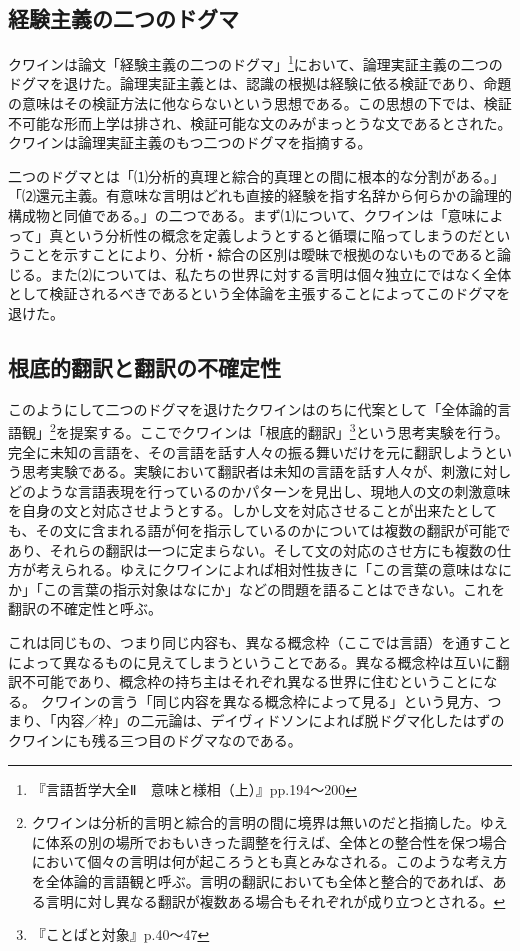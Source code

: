 \documentclass[b5j,twoside,twocolumn]{utarticle}
\begin{document}
\subsection{経験主義の二つのドグマ}
クワインは論文「経験主義の二つのドグマ」\footnote{『言語哲学大全Ⅱ　意味と様相（上）』pp.194〜200}において、論理実証主義の二つのドグマを退けた。論理実証主義とは、認識の根拠は経験に依る検証であり、命題の意味はその検証方法に他ならないという思想である。この思想の下では、検証不可能な形而上学は排され、検証可能な文のみがまっとうな文であるとされた。クワインは論理実証主義のもつ二つのドグマを指摘する。


二つのドグマとは「⑴分析的真理と綜合的真理との間に根本的な分割がある。」「⑵還元主義。有意味な言明はどれも直接的経験を指す名辞から何らかの論理的構成物と同値である。」の二つである。まず⑴について、クワインは「意味によって」真という分析性の概念を定義しようとすると循環に陥ってしまうのだということを示すことにより、分析・綜合の区別は曖昧で根拠のないものであると論じる。また⑵については、私たちの世界に対する言明は個々独立にではなく全体として検証されるべきであるという全体論を主張することによってこのドグマを退けた。
\subsection{根底的翻訳と翻訳の不確定性}
このようにして二つのドグマを退けたクワインはのちに代案として「全体論的言語観」\footnote{クワインは分析的言明と綜合的言明の間に境界は無いのだと指摘した。ゆえに体系の別の場所でおもいきった調整を行えば、全体との整合性を保つ場合において個々の言明は何が起ころうとも真とみなされる。このような考え方を全体論的言語観と呼ぶ。言明の翻訳においても全体と整合的であれば、ある言明に対し異なる翻訳が複数ある場合もそれぞれが成り立つとされる。}を提案する。ここでクワインは「根底的翻訳」\footnote{ 『ことばと対象』p.40〜47}という思考実験を行う。完全に未知の言語を、その言語を話す人々の振る舞いだけを元に翻訳しようという思考実験である。実験において翻訳者は未知の言語を話す人々が、刺激に対しどのような言語表現を行っているのかパターンを見出し、現地人の文の刺激意味を自身の文と対応させようとする。しかし文を対応させることが出来たとしても、その文に含まれる語が何を指示しているのかについては複数の翻訳が可能であり、それらの翻訳は一つに定まらない。そして文の対応のさせ方にも複数の仕方が考えられる。ゆえにクワインによれば相対性抜きに「この言葉の意味はなにか」「この言葉の指示対象はなにか」などの問題を語ることはできない。これを翻訳の不確定性と呼ぶ。


これは同じもの、つまり同じ内容も、異なる概念枠（ここでは言語）を通すことによって異なるものに見えてしまうということである。異なる概念枠は互いに翻訳不可能であり、概念枠の持ち主はそれぞれ異なる世界に住むということになる。
クワインの言う「同じ内容を異なる概念枠によって見る」という見方、つまり、「内容／枠」の二元論は、デイヴィドソンによれば脱ドグマ化したはずのクワインにも残る三つ目のドグマなのである。
\end{document}
